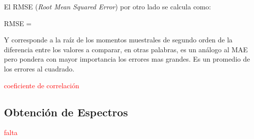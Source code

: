 El RMSE (\emph{Root Mean Squared Error}) por otro lado se calcula como:

\be 
RMSE = 
\ee

Y corresponde a la raíz de los momentos muestrales de segundo orden de la diferencia entre los valores a comparar, en otras palabras, es un análogo al MAE pero pondera con mayor importancia los errores mas grandes. Es un promedio de los errores al cuadrado.

\textcolor{red}{coeficiente de correlación}
\subsection{Obtención de Espectros}
\textcolor{red}{falta}